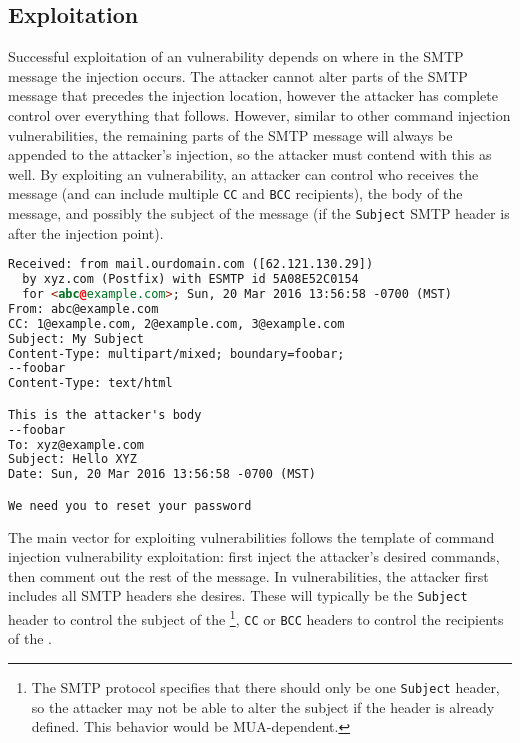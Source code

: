 \subsection{Exploitation}
\label{exploitation}
Successful exploitation of an \ehi vulnerability depends on where in
the SMTP message the injection occurs. The attacker cannot alter parts
of the SMTP message that precedes the injection location, however the
attacker has complete control over everything that follows. However,
similar to other command injection vulnerabilities, the remaining
parts of the SMTP message will always be appended to the attacker's
injection, so the attacker must contend with this as well. By
exploiting an \ehi vulnerability, an attacker can control who receives
the message (and can include multiple \texttt{CC} and \texttt{BCC}
recipients), the body of the message, and possibly the subject of the
message (if the \texttt{Subject} SMTP header is after the injection
point). 

\begin{lstlisting}[language=HTML,caption={Exploiting the \ehi
      vulnerability in Listing~\ref{code:phpemi} to control the
      recipients, subject, and body of the SMTP message.},label={code:ehiexploit}, float]
Received: from mail.ourdomain.com ([62.121.130.29])
  by xyz.com (Postfix) with ESMTP id 5A08E52C0154
  for <abc@example.com>; Sun, 20 Mar 2016 13:56:58 -0700 (MST)
From: abc@example.com
CC: 1@example.com, 2@example.com, 3@example.com
Subject: My Subject
Content-Type: multipart/mixed; boundary=foobar;
--foobar
Content-Type: text/html

This is the attacker's body
--foobar
To: xyz@example.com
Subject: Hello XYZ
Date: Sun, 20 Mar 2016 13:56:58 -0700 (MST)

We need you to reset your password
\end{lstlisting}

The main vector for exploiting \ehi vulnerabilities follows the
template of command injection vulnerability exploitation: first inject
the attacker's desired commands, then comment out the rest of the
message. In \ehi vulnerabilities, the attacker first includes all SMTP
headers she desires. These will typically be the \texttt{Subject}
header to control the subject of the \email\footnote{The SMTP protocol
  specifies that there should only be one \texttt{Subject} header, so
  the attacker may not be able to alter the subject if the header is
  already defined. This behavior would be MUA-dependent.}, \texttt{CC}
or \texttt{BCC} headers to control the recipients of the \email.

